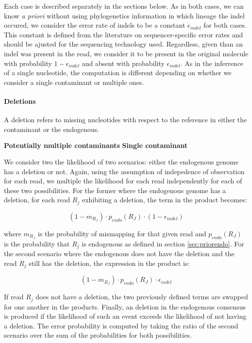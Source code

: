 \documentclass[a4paper,12pt]{article}
\begin{document}
\noindent Each case is described separately in the sections below. As in both cases, we can know {\it a priori} without using phylogenetics information in which lineage the indel occured, we consider the error rate of indels to be a constant $\epsilon_{indel}$ for both cases. This constant is defined from the literature on sequencer-specific error rates and should be ajusted for the sequencing technology used. Regardless, given than an indel was present in the read, we consider it to be present in the original molecule with probability $1-\epsilon_{indel}$ and absent with probability $\epsilon_{indel}$. As in the inferrence of a single nucleotide, the computation is different depending on whether we consider a single contaminant or multiple ones.

\paragraph{Deletions}

A deletion refers to missing nucleotides with respect to the reference in either the contaminant or the endogenous.

{\bf Potentially multiple contaminants}
{\bf Single contaminant}

We consider two the likelihood of two scenarios: either the endogenous genome has a deletion or not. Again, using the assumption of indepedence of observation for each read, we multiple the likelihood for each read independently for each of these two possibilities. For the former where the endogenous genome has a deletion, for each read $R_j$ exhibiting a deletion, the term in the product becomes:

\begin{equation}
 (1-m_{R_J}) \cdot p_{endo}(R_J) \cdot (1-\epsilon_{indel})
\label{eqn:correctindel}
\end{equation}

\noindent where $m_{R_J}$ is the probability of mismapping for that given read and $p_{endo}(R_J)$ is the probability that $R_j$ is endogenous as defined in section \ref{sec:priorendo}. For the second scenario where the endogenous does not have the deletion and the read $R_j$ still has the deletion, the expression in the product is:

\begin{equation}
 (1-m_{R_J}) \cdot p_{endo}(R_J) \cdot \epsilon_{indel}
\label{eqn:incorrectindel}
\end{equation}

\noindent If read $R_j$ does not have a deletion, the two previously defined terms are swapped for one another in the products. Finally, an deletion in the endogenous consensus is produced if the likelihood of such an event exceeds the likelihood of not having a deletion. The error probability is computed by taking the ratio of the second scenario over the sum of the probabilities for both possibilities.
\end{document}
